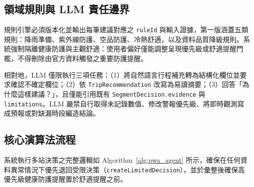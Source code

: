 \documentclass[conference]{IEEEtran}
\begin{document}
\subsection{領域規則與 LLM 責任邊界}
規則引擎必須版本化並輸出每筆建議對應之 \texttt{ruleId} 與輸入證據，第一版涵蓋五類規則：降雨準備、紫外線防護、空品防護、冷熱舒適，以及資料品質降級規則。系統強制隔離健康防護與主觀舒適：使用者偏好僅能調整呈現優先級或舒適提醒門檻，不得刪除由官方資料觸發之重要防護提醒。

相對地，LLM 僅限執行三項任務：（1）將自然語言行程補充轉為結構化欄位並要求確認不確定欄位；（2）依 \texttt{TripRecommendation} 改寫為易讀摘要；（3）回答「為什麼這樣建議？」，且僅能引用既有 \texttt{SegmentDecision.evidence} 與 \texttt{limitations}。LLM 嚴禁自行取得未記錄數值、修改警報優先級、將即時觀測寫成預報或對缺漏時段編造結論。

\subsection{核心演算法流程}
系統執行多站決策之完整邏輯如 Algorithm~\ref{alg:pwa_agent} 所示，確保在任何資料異常情況下優先退回受限決策（\texttt{createLimitedDecision}），並於彙整後確保高優先級健康防護提醒置於舒適提醒之前。
\end{document}
